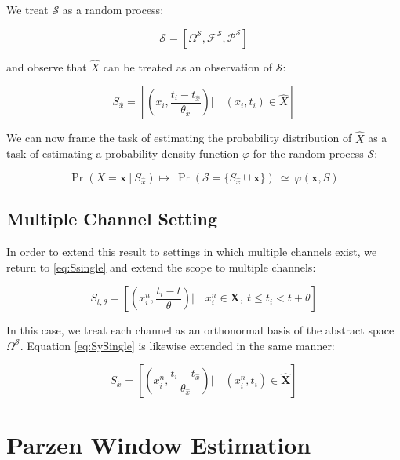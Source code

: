 \documentclass[10pt]{article}
\begin{document}
We treat \( \mathcal{S} \) as a random process:

\[ \mathcal{S} = [ \Omega^\mathcal{S}, \mathcal{F}^\mathcal{S},\mathcal{P}^\mathcal{S}] \]

 and observe that \( \hat{X} \) can be treated as an observation of \( \mathcal{S} \):

\begin{equation} \label{eq:SySingle} 
S_{\hat{x}} =  \left[ \left( x_i,\frac{t_i - t_{\hat{x}}}{\theta_{\hat{x}}} \right) \Big| \quad (x_i,t_i) \in \hat{X} \right] 
\end{equation}

We can now frame the task of estimating the probability distribution of \( \hat{X} \) as a task of estimating a probability density function \( \varphi \) for the random process \( \mathcal{S} \): 

\begin{equation} \label{eq:PrS}
\Pr( X = \mathbf{x} \ | \ S_{\hat{x}} ) \mapsto \ \Pr( \mathcal{S} = \{ S_{\hat{x}} \cup \mathbf{x} \} ) \ \simeq \ \varphi( \mathbf{x}, S )
\end{equation}


\subsection{Multiple Channel Setting}

In order to extend this result to settings in which multiple channels exist, we return to \ref{eq:Ssingle} and extend the scope to multiple channels:

\begin{equation} \label{eq:Smultiple} S_{t,\theta} = \left[ \left( x_i^n,\frac{t_i - t}{\theta} \right) \Big| \quad x_i^n \in \mathbf{X}, \ t \le t_i < t+\theta \right] \end{equation}

In this case, we treat each channel as an orthonormal basis of the abstract space \( \Omega^\mathcal{S} \).  Equation \ref{eq:SySingle} is likewise extended in the same manner:

\begin{equation} \label{eq:SyMultiple} 
S_{\hat{x}} =  \left[ \left( x_i^n,\frac{t_i - t_{\hat{x}}}{\theta_{\hat{x}}} \right) \Big| \quad (x_i^n,t_i) \in \mathbf{\hat{X}} \right] 
\end{equation}

\section{ Parzen Window Estimation}
\end{document}
